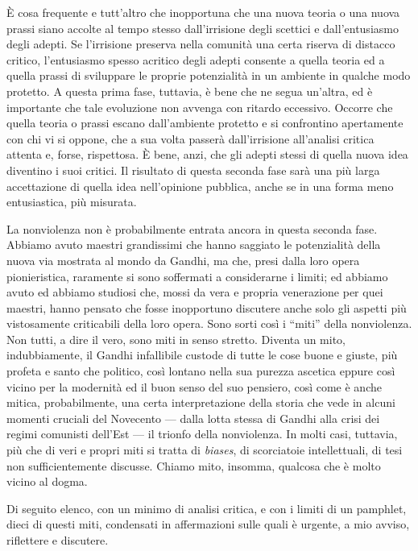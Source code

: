 \documentclass[12pt,oneside,openany]{book}
\begin{document}
È cosa frequente e tutt'altro che inopportuna che una nuova teoria o una nuova prassi siano accolte al tempo stesso dall'irrisione degli scettici e dall'entusiasmo degli adepti. Se l'irrisione preserva nella comunità una certa riserva di distacco critico, l'entusiasmo spesso acritico degli adepti consente a quella teoria ed a quella prassi di sviluppare le proprie potenzialità in un ambiente in qualche modo protetto. A questa prima fase, tuttavia, è bene che ne segua un'altra, ed è importante che tale evoluzione non avvenga con ritardo eccessivo. Occorre che quella teoria o prassi escano dall'ambiente protetto e si confrontino apertamente con chi vi si oppone, che a sua volta passerà dall'irrisione all'analisi critica attenta e, forse, rispettosa. È bene, anzi, che gli adepti stessi di quella nuova idea diventino i suoi critici. Il risultato di questa seconda fase sarà una più larga accettazione di quella idea nell'opinione pubblica, anche se in una forma meno entusiastica, più misurata.



La nonviolenza non è probabilmente entrata ancora in questa seconda fase. Abbiamo avuto maestri grandissimi che hanno saggiato le potenzialità della nuova via mostrata al mondo da Gandhi, ma che, presi dalla loro opera pionieristica, raramente si sono soffermati a considerarne i limiti; ed abbiamo avuto ed abbiamo studiosi che, mossi da vera e propria venerazione per quei maestri, hanno pensato che fosse inopportuno discutere anche solo gli aspetti più vistosamente criticabili della loro opera. Sono sorti così i ``miti'' della nonviolenza. Non tutti, a dire il vero, sono miti in senso stretto. Diventa un mito, indubbiamente, il Gandhi infallibile custode di tutte le cose buone e giuste, più profeta e santo che politico, così lontano nella sua purezza ascetica eppure così vicino per la modernità ed il buon senso del suo pensiero, così come è anche mitica, probabilmente, una certa interpretazione della storia che vede in alcuni momenti cruciali del Novecento --- dalla lotta stessa di Gandhi alla crisi dei regimi comunisti dell'Est --- il trionfo della nonviolenza. In molti casi, tuttavia, più che di veri e propri miti si tratta di \emph{biases}, di scorciatoie intellettuali, di tesi non sufficientemente discusse. Chiamo mito, insomma, qualcosa che è molto vicino al dogma.



Di seguito elenco, con un minimo di analisi critica, e con i limiti di un pamphlet, dieci di questi miti, condensati in affermazioni sulle quali è urgente, a mio avviso, riflettere e discutere.
\end{document}
